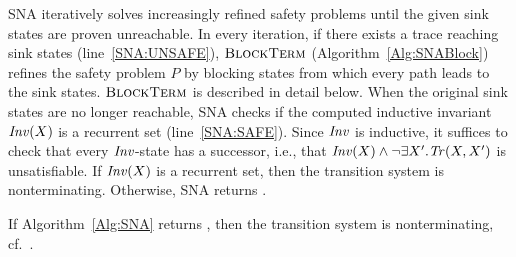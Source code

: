 SNA iteratively solves increasingly refined safety problems until the given sink states are proven unreachable.
In every iteration, if there exists a trace reaching sink states (line~\ref{SNA:UNSAFE}), $\textsc{BlockTerm}$ (Algorithm~\ref{Alg:SNABlock}) refines the safety problem $P$ by blocking states from which every path
leads to the sink states.
$\textsc{BlockTerm}$ is described in detail below.
When the original sink states are no longer reachable, SNA checks if the computed inductive invariant $\mathit{Inv}(X)$ is a recurrent set (line~\ref{SNA:SAFE}).
Since $\mathit{Inv}$ is inductive, it suffices to check that every $\mathit{Inv}$-state has a successor, i.e., that $\mathit{Inv}(X) \land \lnot \exists X'. \mathit{Tr}(X,X')$ is unsatisfiable.
If $\mathit{Inv}(X)$ is a recurrent set, then the transition system is nonterminating.
Otherwise, SNA returns \UNKNOWN.


\begin{lemma}\label{Lem:NONTERM}
    If Algorithm~\ref{Alg:SNA} returns \NONTERM, then the transition system is nonterminating, cf.~\cite{DBLP:conf/tacas/ChenCFNO14}.
\end{lemma}

